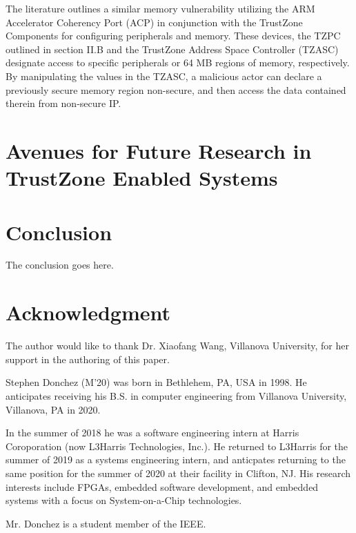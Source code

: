 \documentclass[journal]{IEEEtran}
\begin{document}
The literature \cite{benhani_security_2019} outlines a similar memory vulnerability
utilizing the ARM Accelerator Coherency Port (ACP) in conjunction with the TrustZone
Components for configuring peripherals and memory. These devices, the TZPC outlined in 
section II.B and the TrustZone Address Space Controller (TZASC) designate access to
specific peripherals or 64 MB regions of memory, respectively. By manipulating the values
in the TZASC, a malicious actor can declare a previously secure memory region non-secure,
and then access the data contained therein from non-secure IP.

\section{Avenues for Future Research in TrustZone Enabled Systems}


\section{Conclusion}
The conclusion goes here.

\section*{Acknowledgment}
The author would like to thank Dr. Xiaofang Wang, Villanova University, for her support in
the authoring of this paper.




\begin{IEEEbiography}
	{Stephen Donchez}
(M'20) was born in Bethlehem, PA, USA in 1998. He anticipates receiving his B.S. in
computer engineering from Villanova University, Villanova, PA in 2020.

In the summer of 2018 he was a software engineering intern at Harris Coroporation 
(now L3Harris Technologies, Inc.). He returned to L3Harris for the summer of 2019 as a 
systems engineering intern, and anticpates returning to the same position for the summer
of 2020 at their facility in Clifton, NJ. His research interests include FPGAs, embedded
software development, and embedded systems with a focus on System-on-a-Chip technologies.

Mr. Donchez is a student member of the IEEE.
\end{IEEEbiography}
\end{document}
